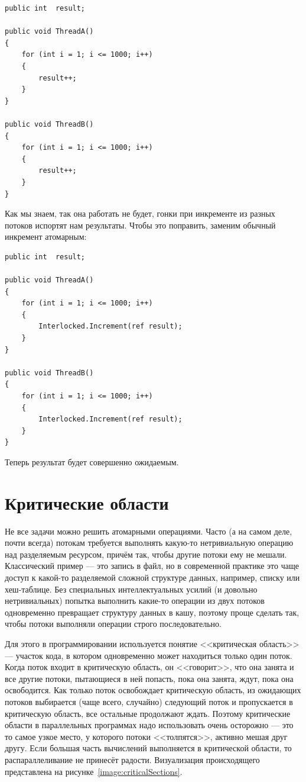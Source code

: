 \documentclass[a5paper]{article}
\begin{document}
\begin{verbatim}
public int  result;

public void ThreadA()
{
    for (int i = 1; i <= 1000; i++) 
    {
        result++;
    }
}

public void ThreadB()
{
    for (int i = 1; i <= 1000; i++) 
    {
        result++; 
    }
}
\end{verbatim}

Как мы знаем, так она работать не будет, гонки при инкременте из разных потоков испортят нам результаты. Чтобы это поправить, заменим обычный инкремент атомарным:

\begin{verbatim}
public int  result;

public void ThreadA()
{
    for (int i = 1; i <= 1000; i++) 
    {
        Interlocked.Increment(ref result);
    }
}

public void ThreadB()
{
    for (int i = 1; i <= 1000; i++) 
    {
        Interlocked.Increment(ref result); 
    }
}
\end{verbatim}

Теперь результат будет совершенно ожидаемым.

\section{Критические области}

Не все задачи можно решить атомарными операциями. Часто (а на самом деле, почти всегда) потокам требуется выполнять какую-то нетривиальную операцию над разделяемым ресурсом, причём так, чтобы другие потоки ему не мешали. Классический пример --- это запись в файл, но в современной практике это чаще доступ к какой-то разделяемой сложной структуре данных, например, списку или хеш-таблице. Без специальных интеллектуальных усилий (и довольно нетривиальных) попытка выполнить какие-то операции из двух потоков одновременно превращает структуру данных в кашу, поэтому проще сделать так, чтобы потоки выполняли операции строго последовательно.

Для этого в программировании используется понятие <<критическая область>> --- участок кода,  в котором одновременно может находиться только один поток. Когда поток входит в критическую область, он <<говорит>>, что она занята и все другие потоки, пытающиеся в ней попасть, пока она занята, ждут, пока она освободится. Как только поток освобождает критическую область, из ожидающих потоков выбирается (чаще всего, случайно) следующий поток и пропускается в критическую область, все остальные продолжают ждать. Поэтому критические области в параллельных программах надо использовать очень осторожно --- это то самое узкое место, у которого потоки <<толпятся>>, активно мешая друг другу. Если большая часть вычислений выполняется в критической области, то распараллеливание не принесёт радости. Визуализация происходящего представлена на рисунке~\ref{image:criticalSections}.
\end{document}
